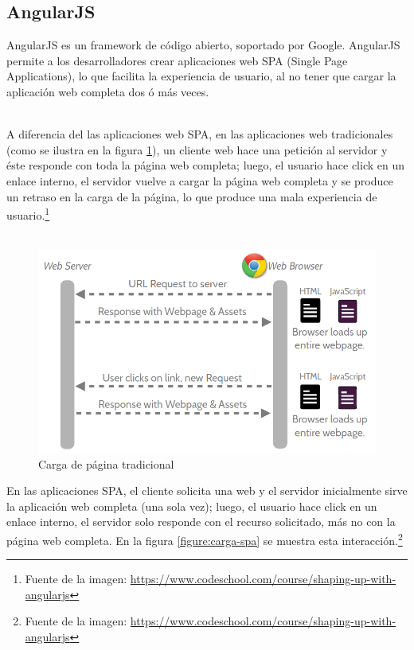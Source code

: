 	
	\subsection{AngularJS}
		AngularJS es un framework de código abierto, soportado por Google. AngularJS
		permite a los desarrolladores crear aplicaciones web SPA (Single Page Applications), lo
		que facilita la experiencia de usuario, al no tener que cargar la
		aplicación web completa dos ó más veces.\\\
		
		A diferencia del las aplicaciones web SPA, en las aplicaciones
		web tradicionales (como se ilustra en la figura
		\ref{figure:carga-tradicional}), un cliente web hace una petición al servidor
		y éste responde con toda la página web completa; luego, el usuario hace click
		en un enlace interno, el servidor vuelve a cargar la página web completa
		y se produce un retraso en la carga de la página, lo que produce una mala
		experiencia de usuario.\footnote{Fuente de la imagen:
		\href{https://www.codeschool.com/course/shaping-up-with-angularjs}
		{https://www.codeschool.com/course/shaping-up-with-angularjs}} \\\
		
		\newpage
		
		\begin{figure}[H]
		    \centering
			\includegraphics[width=18cm]{../imgs/ejemplos/1.png}
			\caption{Carga de página tradicional}
			\label{figure:carga-tradicional}
		\end{figure}
		
		
		En las aplicaciones SPA, el cliente solicita una web y el servidor
		inicialmente sirve la aplicación web completa (una sola vez); luego, el
		usuario hace click en un enlace interno, el servidor solo responde con el recurso
		solicitado, más no con la página web completa. En la figura
		\ref{figure:carga-spa} se muestra esta interacción.\footnote{Fuente de la imagen: 
		\href{https://www.codeschool.com/course/shaping-up-with-angularjs}
		{https://www.codeschool.com/course/shaping-up-with-angularjs}}
		
